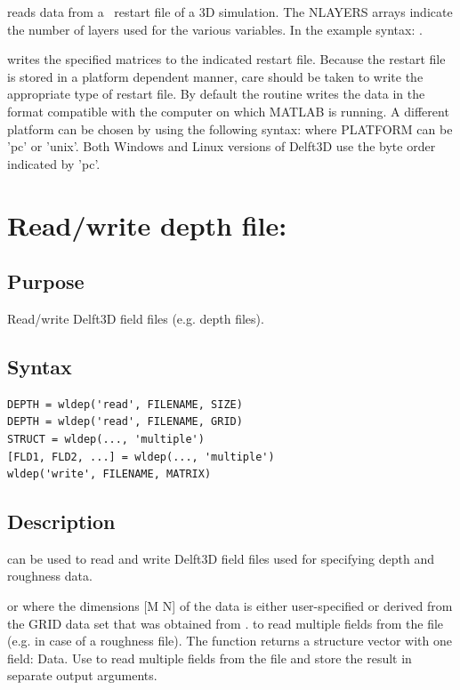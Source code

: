  reads data from a \DFLOW\ restart file of a 3D simulation.
The NLAYERS arrays indicate the number of layers used for the various variables.
In the example syntax: .

 writes the specified matrices to the indicated restart file.
Because the restart file is stored in a platform dependent manner, care should be taken to write the appropriate type of restart file.
By default the routine writes the data in the format compatible with the computer on which MATLAB is running.
A different platform can be chosen by using the following syntax:
where PLATFORM can be 'pc' or 'unix'.
Both Windows and Linux versions of Delft3D use the byte order indicated by 'pc'.

\section{Read/write depth file: }

\subsection*{Purpose}
Read/write Delft3D field files (e.g. depth files).

\subsection*{Syntax}
\begin{Verbatim}
DEPTH = wldep('read', FILENAME, SIZE)
DEPTH = wldep('read', FILENAME, GRID)
STRUCT = wldep(..., 'multiple')
[FLD1, FLD2, ...] = wldep(..., 'multiple')
wldep('write', FILENAME, MATRIX)
\end{Verbatim}

\subsection*{Description}
 can be used to read and write Delft3D field files used for specifying depth and roughness data.

 or  where the dimensions [M N] of the data is either user-specified or derived from the GRID data set that was obtained from .
 to read multiple fields from the file (e.g. in case of a roughness file).
The function returns a structure vector with one field: Data.
Use  to read multiple fields from the file and store the result in separate output arguments.

